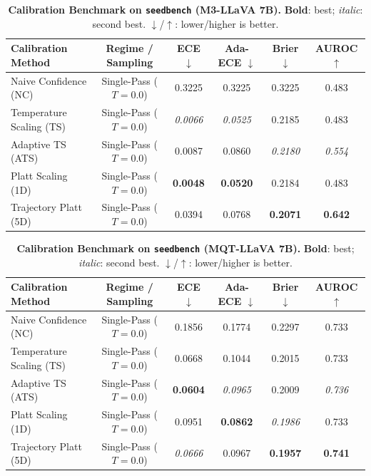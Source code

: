 \begin{table}[t]
\setlength{\tabcolsep}{4pt}
\renewcommand{\arraystretch}{1.05}
\centering
\footnotesize
\begin{tabular}{lccccc}
\toprule
\textbf{Calibration Method} & \textbf{Regime / Sampling} & \textbf{ECE} $\downarrow$ & \textbf{Ada-ECE} $\downarrow$ & \textbf{Brier} $\downarrow$ & \textbf{AUROC} $\uparrow$ \\
\midrule
Naive Confidence (NC) & Single-Pass ($T = 0.0$) & 0.3225 & 0.3225 & 0.3225 & 0.483 \\
Temperature Scaling (TS) & Single-Pass ($T = 0.0$) & \textit{0.0066} & \textit{0.0525} & 0.2185 & 0.483 \\
Adaptive TS (ATS) & Single-Pass ($T = 0.0$) & 0.0087 & 0.0860 & \textit{0.2180} & \textit{0.554} \\
Platt Scaling (1D) & Single-Pass ($T = 0.0$) & \textbf{0.0048} & \textbf{0.0520} & 0.2184 & 0.483 \\
Trajectory Platt (5D) & Single-Pass ($T = 0.0$) & 0.0394 & 0.0768 & \textbf{0.2071} & \textbf{0.642} \\
\bottomrule
\end{tabular}
\caption{\textbf{Calibration Benchmark on \texttt{seedbench} (M3-LLaVA 7B).} \textbf{Bold}: best; \textit{italic}: second best. $\downarrow$/$\uparrow$: lower/higher is better.}
\label{tab:benchmark_m3_seedbench}
\end{table}

\begin{table}[t]
\setlength{\tabcolsep}{4pt}
\renewcommand{\arraystretch}{1.05}
\centering
\footnotesize
\begin{tabular}{lccccc}
\toprule
\textbf{Calibration Method} & \textbf{Regime / Sampling} & \textbf{ECE} $\downarrow$ & \textbf{Ada-ECE} $\downarrow$ & \textbf{Brier} $\downarrow$ & \textbf{AUROC} $\uparrow$ \\
\midrule
Naive Confidence (NC) & Single-Pass ($T = 0.0$) & 0.1856 & 0.1774 & 0.2297 & 0.733 \\
Temperature Scaling (TS) & Single-Pass ($T = 0.0$) & 0.0668 & 0.1044 & 0.2015 & 0.733 \\
Adaptive TS (ATS) & Single-Pass ($T = 0.0$) & \textbf{0.0604} & \textit{0.0965} & 0.2009 & \textit{0.736} \\
Platt Scaling (1D) & Single-Pass ($T = 0.0$) & 0.0951 & \textbf{0.0862} & \textit{0.1986} & 0.733 \\
Trajectory Platt (5D) & Single-Pass ($T = 0.0$) & \textit{0.0666} & 0.0967 & \textbf{0.1957} & \textbf{0.741} \\
\bottomrule
\end{tabular}
\caption{\textbf{Calibration Benchmark on \texttt{seedbench} (MQT-LLaVA 7B).} \textbf{Bold}: best; \textit{italic}: second best. $\downarrow$/$\uparrow$: lower/higher is better.}
\label{tab:benchmark_mqt_seedbench}
\end{table}
